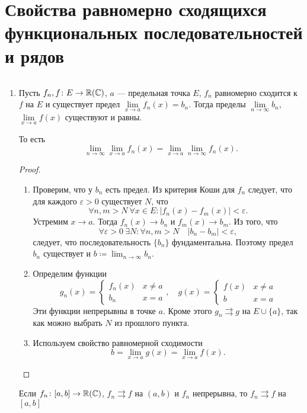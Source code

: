 \section{Свойства равномерно сходящихся функциональных последовательностей и рядов}
\begin{prop}
	$ $
	\begin{enumerate}
		\item \label{prop:rsf1} Пусть $ f_n, f\colon E \to \mathbb{R}(\mathbb{C})$, $ a$ --- предельная точка  $ E$,  $ f_n$ равномерно сходится к  $ f$ на $ E$ и существует предел $ \lim\limits_{x \to  a}f_n(x) = b_n$.
			Тогда пределы $ \lim\limits_{n \to  \infty} b_n$, $ \lim\limits_{x \to a} f(x)$ существуют и равны.

			То есть \[
				\lim_{n \to \infty} \lim_{x \to  a} f_n(x) = \lim_{x \to  a} \lim_{n \to \infty} f_n(x)
			.\]
			\begin{proof}
				$ $
				\begin{enumerate}
					\item Проверим, что у $ b_n$ есть предел. Из критерия Коши для $ f_n$ следует, что для каждого  $ \varepsilon >0$ существует $ N$, что
						\[
							\forall n, m > N ~ \forall x \in E \colon \lvert f_n(x) - f_m(x) \rvert < \varepsilon
						.\]
						Устремим $ x \to  a$. Тогда $ f_n(x) \to b_n$ и $ f_m(x) \to b_m$. Из того, что
						\[
							\forall \varepsilon  > 0 ~ \exists N\colon \forall n, m > N \quad \lvert b_n - b_m \rvert < \varepsilon
						,\]
						следует, что  последовательность $ \{b_n\}$ фундаментальна. Поэтому предел  $ b_n$ существует и  $ b\coloneqq \lim_{n \to \infty} b_n $.
					\item Определим функции
						\[
							g_n(x) =
							\begin{cases}
								f_n(x) & x \ne a \\
								b_n & x = a
							\end{cases}
							,
							\quad
							g(x) =
							\begin{cases}
								f(x) & x \ne a \\
								b & x = a
							\end{cases}
						\]
						Эти функции непрерывны в точке $ a$. Кроме этого  $ g_n \rightrightarrows g$ на $ E \cup \{a\}$, так как можно выбрать $ N$ из прошлого пункта.
					\item Используем свойство равномерной сходимости %
						\[
							b = \lim_{x \to  a} g(x) = \lim_{x \to a} f(x)
						.\]
				\end{enumerate}
			\end{proof}
			\begin{cor}
				Если $ f_n \colon [a, b] \to \mathbb{R}(\mathbb{C})$, $ f_n \rightrightarrows f$ на $ (a, b)$ и $ f_n$ непрерывна, то $ f_n \rightrightarrows f$ на $ [a, b]$
			\end{cor}
	\end{enumerate}
\end{prop}
% 
